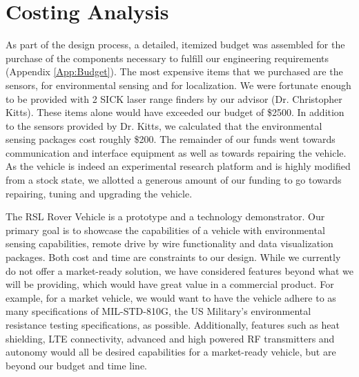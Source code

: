 \chapter{Costing Analysis}

As part of the design process, a detailed, itemized budget was assembled for the purchase of the components necessary to fulfill our engineering requirements (Appendix \ref{App:Budget}). The most expensive items that we purchased are the sensors, for environmental sensing and for localization. We were fortunate enough to be provided with 2 SICK laser range finders by our advisor (Dr. Christopher Kitts). These items alone would have exceeded our budget of \$2500. In addition to the sensors provided by Dr. Kitts, we calculated that the environmental sensing packages cost roughly \$200. The remainder of our funds went towards communication and interface equipment as well as towards repairing the vehicle. As the vehicle is indeed an experimental research platform and is highly modified from a stock state, we allotted a generous amount of our funding to go towards repairing, tuning and upgrading the vehicle.

The RSL Rover Vehicle is a prototype and a technology demonstrator. Our primary goal is to showcase the capabilities of a vehicle with environmental sensing capabilities, remote drive by wire functionality and data visualization packages. Both cost and time are constraints to our design. While we currently do not offer a market-ready solution, we have considered features beyond what we will be providing, which would have great value in a commercial product. For example, for a market vehicle, we would want to have the vehicle adhere to as many specifications of MIL-STD-810G, the US Military's environmental resistance testing specifications, as possible. Additionally, features such as heat shielding, LTE connectivity, advanced and high powered RF transmitters and autonomy would all be desired capabilities  for a market-ready vehicle, but are beyond our budget and time line.
